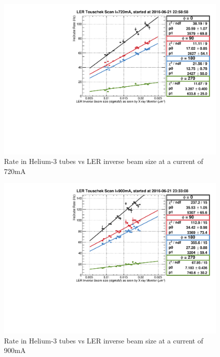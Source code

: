 \begin{figure}[htb]
	\centerfloat
		\includegraphics[trim={0 0 0 0.75cm},clip, scale=0.6]{images/13008}
	\caption{Rate in Helium-3 tubes vs LER inverse beam size at a current of 720mA}	
	\label{fig:TousLER13008}
\end{figure}


\begin{figure}[htb]
	\centerfloat
		\includegraphics[trim={0 0 0 0.75cm},clip, scale=0.6]{images/13009}
	\caption{Rate in Helium-3 tubes vs LER inverse beam size at a current of 900mA}	
	\label{fig:TousLER13009}
\end{figure}



